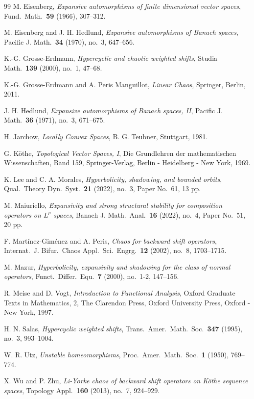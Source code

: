 \documentclass[12pt]{amsart}
\theoremstyle{theorem}
\theoremstyle{definition}
\theoremstyle{remark} \theoremstyle{question} \theoremstyle{example}
\begin{document}
\begin{thebibliography}{99}
 M. Eisenberg,
    {\it Expansive automorphisms of  finite dimensional vector spaces}, Fund.\ Math.\ {\bf 59} (1966), 307--312.

 M. Eisenberg and J. H. Hedlund,
    {\it Expansive automorphisms of Banach spaces}, Pacific J. Math.\ {\bf 34} (1970), no.\ 3, 647--656.

 K.-G. Grosse-Erdmann,
    {\it Hypercyclic and chaotic weighted shifts}, Studia Math.\ {\bf 139} (2000), no.\ 1, 47--68.
    
 K.-G. Grosse-Erdmann and A. Peris Manguillot,
    {\it Linear Chaos}, Springer, Berlin, 2011.

 J. H. Hedlund,
    {\it Expansive automorphisms of Banach spaces, II}, Pacific J. Math.\ {\bf 36} (1971), no.\ 3, 671--675.

 H. Jarchow,
    {\it Locally Convex Spaces}, B. G. Teubner, Stuttgart, 1981.

 G. K\"othe,
    {\it Topological Vector Spaces, I}, Die Grundlehren der mathematischen Wissenschaften, Band 159,
    Springer-Verlag, Berlin - Heidelberg - New York, 1969.

 K. Lee and C. A. Morales,
    {\it Hyperbolicity, shadowing, and bounded orbits}, Qual.\ Theory Dyn.\ Syst.\ {\bf 21} (2022), no.\ 3, Paper No.\ 61, 13 pp.

 M. Maiuriello,
    {\it Expansivity and strong structural stability for composition operators on $L^p$ spaces},
    Banach J. Math.\ Anal.\ {\bf 16} (2022), no.\ 4, Paper No.\ 51, 20 pp.

 F. Mart\'inez-Gim\'enez and A. Peris,
    {\it Chaos for backward shift operators}, Internat.\ J. Bifur.\ Chaos Appl.\ Sci.\ Engrg.\ {\bf 12} (2002), no.\ 8, 1703--1715.

 M. Mazur,
    {\it Hyperbolicity, expansivity and shadowing for the class of normal operators}, Funct.\ Differ.\ Equ.\ {\bf 7} (2000), no.\ 1-2, 147--156.

 R. Meise and D. Vogt,
    {\it Introduction to Functional Analysis}, Oxford Graduate Texts in Mathematics, 2,
    The Clarendon Press, Oxford University Press, Oxford - New York, 1997.

 H. N. Salas,
    {\it Hypercyclic weighted shifts}, Trans.\ Amer.\ Math.\ Soc.\ {\bf 347} (1995), no.\ 3, 993--1004.
    
 W. R. Utz,
    {\it Unstable homeomorphisms}, Proc.\ Amer.\ Math.\ Soc.\ {\bf 1} (1950), 769--774.

 X. Wu and P. Zhu,
    {\it Li-Yorke chaos of backward shift operators on K\"othe sequence spaces}, Topology Appl.\ {\bf 160} (2013), no.\ 7, 924--929.

\end{thebibliography}
\end{document}
